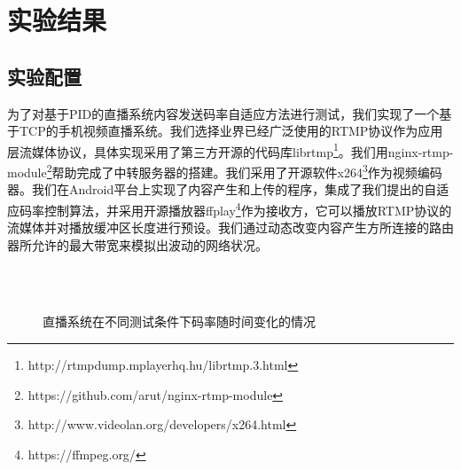 \section{实验结果}

\subsection{实验配置}

为了对基于PID的直播系统内容发送码率自适应方法进行测试，我们实现了一个基于TCP的手机视频直播系统。我们选择业界已经广泛使用的RTMP协议作为应用层流媒体协议，具体实现采用了第三方开源的代码库librtmp\footnote{http://rtmpdump.mplayerhq.hu/librtmp.3.html}。我们用nginx-rtmp-module\footnote{https://github.com/arut/nginx-rtmp-module}帮助完成了中转服务器的搭建。我们采用了开源软件x264\footnote{http://www.videolan.org/developers/x264.html}作为视频编码器。我们在Android平台上实现了内容产生和上传的程序，集成了我们提出的自适应码率控制算法，并采用开源播放器ffplay\footnote{https://ffmpeg.org/}作为接收方，它可以播放RTMP协议的流媒体并对播放缓冲区长度进行预设。我们通过动态改变内容产生方所连接的路由器所允许的最大带宽来模拟出波动的网络状况。

\begin{figure}[!t]
	\centering
	 \\
	 \\
	\caption{直播系统在不同测试条件下码率随时间变化的情况}
	\label{fig:09}
\end{figure}

